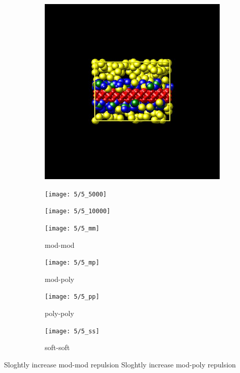\documentclass[a4paper]{article}
\begin{document}
\begin{figure}[H]
\begin{subfigure}{0.3\textwidth}
  \centering
  \includegraphics[width=\linewidth,keepaspectratio]{start}
  \caption{}
\end{subfigure}
\begin{subfigure}{0.3\textwidth}
  \centering
  \texttt{[image: 5/5\_5000]}
  \caption{}
\end{subfigure}
\begin{subfigure}{0.3\textwidth}
  \centering
  \texttt{[image: 5/5\_10000]}
  \caption{}
\end{subfigure}
\caption{}
\label{fig_1}
\end{figure}

\begin{figure}[H]
\begin{subfigure}{0.24\textwidth}
  \centering
  \texttt{[image: 5/5\_mm]}
  \caption{mod-mod}
\end{subfigure}
\begin{subfigure}{0.24\textwidth}
  \centering
  \texttt{[image: 5/5\_mp]}
  \caption{mod-poly}
\end{subfigure}
\begin{subfigure}{0.24\textwidth}
  \centering
  \texttt{[image: 5/5\_pp]}
  \caption{poly-poly}
\end{subfigure}
\begin{subfigure}{0.24\textwidth}
  \centering
  \texttt{[image: 5/5\_ss]}
  \caption{soft-soft}
\end{subfigure}
\caption{}
\label{fig_1}
\end{figure}
Sloghtly increase mod-mod repulsion\newline
Sloghtly increase mod-poly repulsion\newline
\end{document}
